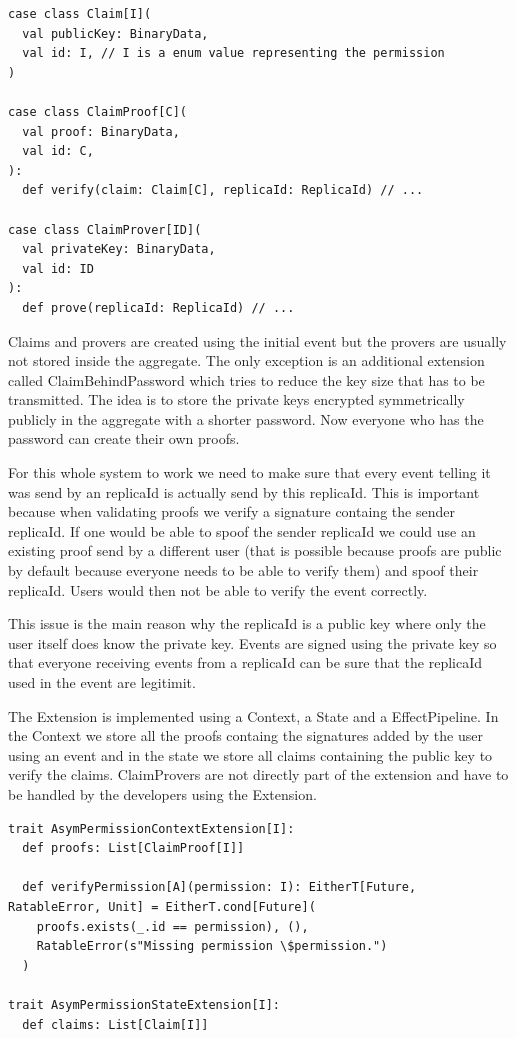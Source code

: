 \documentclass[
	ngerman,
	ruledheaders=section,   %
	class=report,		    %
	thesis={type=bachelor}, %
	accentcolor=9c,			%
	custommargins=true,    %
	marginpar=false,        %
	parskip=half-,          %
	fontsize=11pt,          %
]{tudapub}
\begin{document}
\begin{lstlisting}
case class Claim[I](
  val publicKey: BinaryData,
  val id: I, // I is a enum value representing the permission
)

case class ClaimProof[C](
  val proof: BinaryData,
  val id: C,
):
  def verify(claim: Claim[C], replicaId: ReplicaId) // ...

case class ClaimProver[ID](
  val privateKey: BinaryData,
  val id: ID
):
  def prove(replicaId: ReplicaId) // ...

\end{lstlisting}

Claims and provers are created using the initial event but the provers are usually not stored inside the aggregate. The only exception is an additional extension called ClaimBehindPassword which tries to reduce the key size that has to be transmitted. The idea is to store the private keys encrypted symmetrically publicly in the aggregate with a shorter password. Now everyone who has the password can create their own proofs.

For this whole system to work we need to make sure that every event telling it was send by an replicaId is actually send by this replicaId. This is important because when validating proofs we verify a signature containg the sender replicaId. If one would be able to spoof the sender replicaId we could use an existing proof send by a different user (that is possible because proofs are public by default because everyone needs to be able to verify them) and spoof their replicaId. Users would then not be able to verify the event correctly. 

This issue is the main reason why the replicaId is a public key where only the user itself does know the private key. Events are signed using the private key so that everyone receiving events from a replicaId can be sure that the replicaId used in the event are legitimit.

The Extension is implemented using a Context, a State and a EffectPipeline. In the Context we store all the proofs containg the signatures added by the user using an event and in the state we store all claims containing the public key to verify the claims. ClaimProvers are not directly part of the extension and have to be handled by the developers using the Extension.

\begin{lstlisting}
trait AsymPermissionContextExtension[I]:
  def proofs: List[ClaimProof[I]]

  def verifyPermission[A](permission: I): EitherT[Future, RatableError, Unit] = EitherT.cond[Future](
    proofs.exists(_.id == permission), (),
    RatableError(s"Missing permission \$permission.")
  )

trait AsymPermissionStateExtension[I]:
  def claims: List[Claim[I]]
\end{lstlisting}
\end{document}
